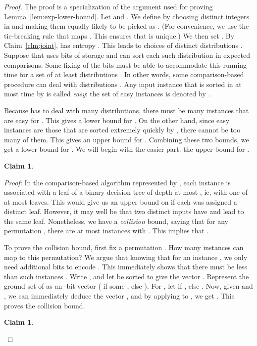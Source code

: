 \documentclass{siamltex}
\newtheorem{claim}[theorem]{Claim}
\begin{document}
\begin{proof}
The proof is a specialization of the argument used for proving
Lemma~\ref{lem:exp-lower-bound}. Let  and
.
We define  by choosing  distinct integers in 
and making them equally likely to be picked as .
(For convenience, we use the tie-breaking rule that maps
. This ensures that  is unique.) We then 
set . By Claim~\ref{clm:joint},  has
entropy .
This leads to  choices of 
distinct distributions .
Suppose that  uses  bits of storage
and can sort each such distribution in  expected comparisons.
Some fixing  of the bits must be able to accommodate
this running time for a set  of 
at least  distributions .
In other words, some comparison-based procedure
can deal with  distributions .
Any input instance that is sorted in at most  time
by  is called \emph{easy}: the set of easy
instances is denoted by .

Because  has to deal with many distributions, there must
be many instances that are easy for . This gives
a lower bound for . On the other hand, 
since easy instances are those that are sorted extremely quickly by ,
there cannot be too many of them. This gives an upper bound for .
Combining these two bounds, we get a lower bound for . We will
begin with the easier part: the upper bound for . 
\begin{claim} \label{clm:E-upper} 

\end{claim} 

\emph{Proof:} 
In the comparison-based algorithm represented by , 
each instance  is associated with a leaf
of a binary decision tree of depth at most , ie, with one
of at most  leaves. This would give us an upper bound
on  if each  was assigned a distinct leaf.
However, it may well be that two distinct inputs  have
 and lead to the same leaf. Nonetheless, we have
a \emph{collision} bound, saying that for any permutation ,
there are at most  instances   with .
This implies that 
.

To prove the collision bound, first fix a permutation . How many
instances can map to this permutation? We argue 
that knowing that  for 
an instance , we only need
 additional bits to encode . This immediately
shows that there must be less than  such instances .
Write ,
and let  be sorted to give the vector .
Represent the ground set of  as an -bit vector 
( if some , else ).
For , let  if ,
else . Now, given  and , we can immediately
deduce the vector , and by applying  to 
, we get .
This proves the collision bound.
\qquad \endproof
\smallskip
\begin{claim} \label{clm:E-lower} 


\end{claim}
\end{proof}
\end{document}
